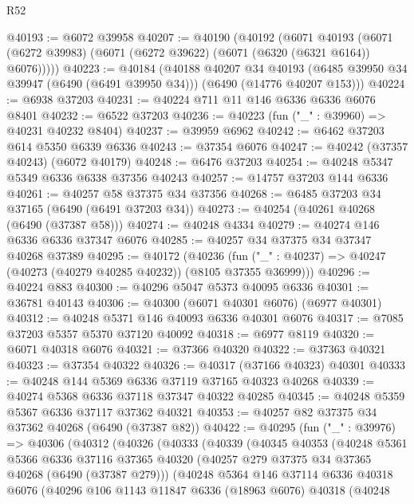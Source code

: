 \begin{lexlean}{R52}
\begin{coremodule}
@40193 := @6072 @39958
@40207 := @40190
    (@40192
      (@6071
        @40193
        (@6071 (@6272 @39983) (@6071 (@6272 @39622) (@6071 (@6320 (@6321 @6164)) @6076)))))
@40223 := @40184
    (@40188
      @40207
      @34
      @40193
      (@6485 @39950 @34 @39947 (@6490 (@6491 @39950 @34)))
      (@6490 (@14776 @40207 @153)))
@40224 := @6938 @37203
@40231 := @40224 @711 @11 @146 @6336 @6336 @6076 @8401
@40232 := @6522 @37203
@40236 := @40223 (fun ("_" : @39960) => @40231 @40232 @8404)
@40237 := @39959 @6962
@40242 := @6462 @37203 @614 @5350 @6339 @6336
@40243 := @37354 @6076
@40247 := @40242 (@37357 @40243) (@6072 @40179)
@40248 := @6476 @37203
@40254 := @40248 @5347 @5349 @6336 @6338 @37356 @40243
@40257 := @14757 @37203 @144 @6336
@40261 := @40257 @58 @37375 @34 @37356
@40268 := @6485 @37203 @34 @37165 (@6490 (@6491 @37203 @34))
@40273 := @40254 (@40261 @40268 (@6490 (@37387 @58)))
@40274 := @40248 @4334
@40279 := @40274 @146 @6336 @6336 @37347 @6076
@40285 := @40257 @34 @37375 @34 @37347 @40268 @37389
@40295 := @40172
    (@40236 (fun ("_" : @40237) => @40247 (@40273 (@40279 @40285 @40232)) (@8105 @37355 @36999)))
@40296 := @40224 @883
@40300 := @40296 @5047 @5373 @40095 @6336
@40301 := @36781 @40143
@40306 := @40300 (@6071 @40301 @6076) (@6977 @40301)
@40312 := @40248 @5371 @146 @40093 @6336 @40301 @6076
@40317 := @7085 @37203 @5357 @5370 @37120 @40092
@40318 := @6977 @8119
@40320 := @6071 @40318 @6076
@40321 := @37366 @40320
@40322 := @37363 @40321
@40323 := @37354 @40322
@40326 := @40317 (@37166 @40323) @40301
@40333 := @40248 @144 @5369 @6336 @37119 @37165 @40323 @40268
@40339 := @40274 @5368 @6336 @37118 @37347 @40322 @40285
@40345 := @40248 @5359 @5367 @6336 @37117 @37362 @40321
@40353 := @40257 @82 @37375 @34 @37362 @40268 (@6490 (@37387 @82))
@40422 := @40295
    (fun ("_" : @39976) =>
    @40306
      (@40312
        (@40326
          (@40333
            (@40339
              (@40345
                @40353
                (@40248
                  @5361
                  @5366
                  @6336
                  @37116
                  @37365
                  @40320
                  (@40257 @279 @37375 @34 @37365 @40268 (@6490 (@37387 @279)))
                  (@40248
                    @5364
                    @146
                    @37114
                    @6336
                    @40318
                    @6076
                    (@40296
                      @106
                      @1143
                      @11847
                      @6336
                      (@18963 @6076)
                      @40318
                      (@40248

\end{coremodule}
\end{lexlean}
